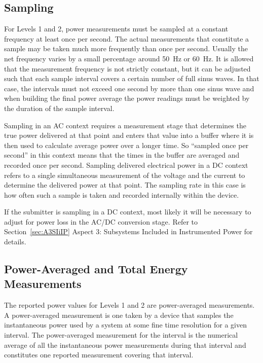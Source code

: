 \subsection{Sampling}
\noindent
For Levels 1 and 2, power measurements must be sampled at a constant frequency at least once per second.
The actual measurements that constitute a sample may be taken much more frequently than once per second.
Usually the net frequency varies by a small percentage around 50~Hz or 60~Hz.
It is allowed that the measurement frequency is not strictly constant, but it can be adjusted such that each sample interval covers a certain number of full sinus waves.
In that case, the intervals must not exceed one second by more than one sinus wave and when building the final power average the power readings must be weighted by the duration of the sample interval.
\wl

\noindent
Sampling in an AC context requires a measurement stage that determines the true power delivered at that point and enters that value into a buffer where it is then used to calculate average power over a longer time.  So ``sampled once per second'' in this context means that the times in the buffer are averaged and recorded once per second.
Sampling delivered electrical power in a DC context refers to a single simultaneous measurement of the voltage and the current to determine the delivered power at that point.  The sampling rate in this case is how often such a sample is taken and recorded internally within the device.  
\wl

\noindent
If the submitter is sampling in a DC context, most likely it will be necessary to adjust for power loss in the AC/DC conversion stage. 
Refer to Section~\ref{sec:A3SIiIP} Aspect 3: Subsystems Included in Instrumented Power for details.

\subsection{Power-Averaged and Total Energy Measurements}
\label{sec:PAaTEM}
\noindent
The reported power values for Levels 1 and 2 are power-averaged measurements. A power-averaged measurement is one taken by a device that samples the instantaneous power used by a system at some fine time resolution for a given interval. The power-averaged measurement for the interval is the numerical average of all the instantaneous power measurements during that interval and constitutes one reported measurement covering that interval. 
\wl

